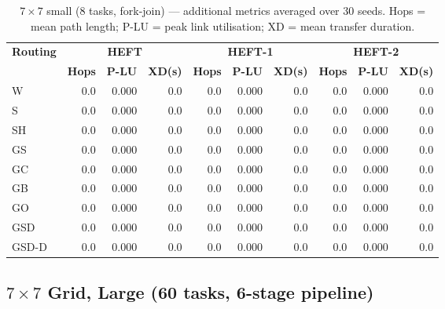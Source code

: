 \documentclass[11pt]{article}
\begin{document}
\begin{table}[H]
\centering\small
\begin{tabular}{l r r r r r r r r r}
\toprule
\textbf{Routing} & \multicolumn{3}{c}{\textbf{HEFT}} & \multicolumn{3}{c}{\textbf{HEFT-1}} & \multicolumn{3}{c}{\textbf{HEFT-2}} \\
\cmidrule(lr){2-4}\cmidrule(lr){5-7}\cmidrule(lr){8-10}
& \textbf{Hops} & \textbf{P-LU} & \textbf{XD(s)} & \textbf{Hops} & \textbf{P-LU} & \textbf{XD(s)} & \textbf{Hops} & \textbf{P-LU} & \textbf{XD(s)} \\
\midrule
  W & 0.0 & 0.000 & 0.0 & 0.0 & 0.000 & 0.0 & 0.0 & 0.000 & 0.0 \\
  S & 0.0 & 0.000 & 0.0 & 0.0 & 0.000 & 0.0 & 0.0 & 0.000 & 0.0 \\
  SH & 0.0 & 0.000 & 0.0 & 0.0 & 0.000 & 0.0 & 0.0 & 0.000 & 0.0 \\
  GS & 0.0 & 0.000 & 0.0 & 0.0 & 0.000 & 0.0 & 0.0 & 0.000 & 0.0 \\
  GC & 0.0 & 0.000 & 0.0 & 0.0 & 0.000 & 0.0 & 0.0 & 0.000 & 0.0 \\
  GB & 0.0 & 0.000 & 0.0 & 0.0 & 0.000 & 0.0 & 0.0 & 0.000 & 0.0 \\
  GO & 0.0 & 0.000 & 0.0 & 0.0 & 0.000 & 0.0 & 0.0 & 0.000 & 0.0 \\
  GSD & 0.0 & 0.000 & 0.0 & 0.0 & 0.000 & 0.0 & 0.0 & 0.000 & 0.0 \\
  GSD-D & 0.0 & 0.000 & 0.0 & 0.0 & 0.000 & 0.0 & 0.0 & 0.000 & 0.0 \\
\bottomrule
\end{tabular}
\caption{$7\times7$ small (8 tasks, fork-join) --- additional metrics averaged over 30 seeds. Hops = mean path length; P-LU = peak link utilisation; XD = mean transfer duration.}
\end{table}

\subsection{$7\times7$ Grid, Large (60 tasks, 6-stage pipeline)}
\end{document}
